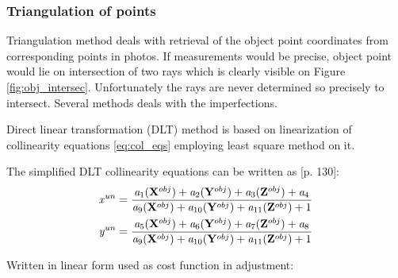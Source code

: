 \documentclass[a4paper,12pt]{article}
\newcommand{\evect}[1]{
{\bf #1}
}
\newcommand{\escal}[1]{
{\it #1}
}
\begin{document}
\subsubsection{Triangulation of points}
\label{sec:triang}

Triangulation method deals with retrieval of the object point coordinates
from corresponding points in photos. 
If measurements would be precise, object point 
would lie on intersection of two rays which is clearly visible on 
 Figure \ref{fig:obj_intersec}. Unfortunately the rays are never determined so precisely to intersect.
 Several methods deals with the imperfections.

Direct linear transformation (DLT) method  is based 
on linearization of collinearity equations \eqref{eq:col_eqs}
employing least square method on it.

The simplified DLT collinearity equations can be written as \cite{pavelka2004foto10}[p. 130]:  
\begin{equation}
\begin{split}
&\escal{x}^{un} = \frac{\escal{a}_{1}(\evect{X}^{obj}) + 
                                  \escal{a}_{2}(\evect{Y}^{obj}) + 
                                  \escal{a}_{3}(\evect{Z}^{obj}) +
                                  \escal{a}_{4}
                                  }{
				  \escal{a}_{9}(\evect{X}^{obj}) + 
                                  \escal{a}_{10}(\evect{Y}^{obj}) + 
                                  \escal{a}_{11}(\evect{Z}^{obj}) +
                                   1  
                                  } \\
&\escal{y}^{un} = \frac{\escal{a}_{5}(\evect{X}^{obj}) + 
                                  \escal{a}_{6}(\evect{Y}^{obj}) + 
                                  \escal{a}_{7}(\evect{Z}^{obj}) +                                 
                                  \escal{a}_{8}
                                  }{
				  \escal{a}_{9}(\evect{X}^{obj}) + 
                                  \escal{a}_{10}(\evect{Y}^{obj}) + 
                                  \escal{a}_{11}(\evect{Z}^{obj}) +    
                                  1
                                  }
\end{split}
\end{equation}
 
Written in linear form used as cost function in adjustment:
\end{document}
